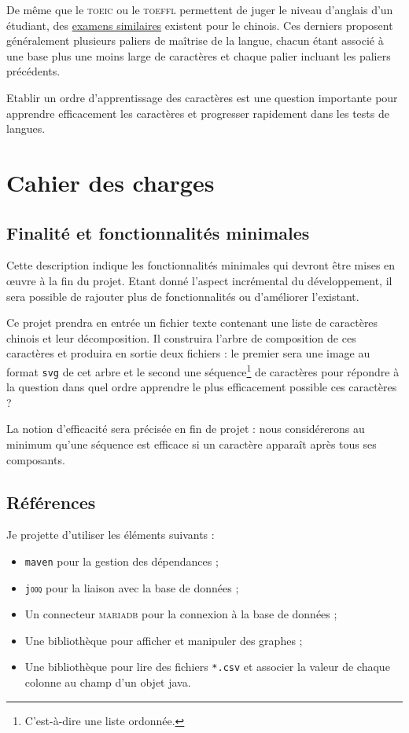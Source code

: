 \documentclass[12pt,oneside]{article}
\begin{document}
De même que le \textsc{toeic} ou le \textsc{toeffl} permettent de juger le niveau d'anglais d'un étudiant, des \href{https://en.wikipedia.org/wiki/Test\_of\_Chinese\_as\_a\_Foreign\_Language}{examens similaires} existent pour le chinois. Ces derniers proposent généralement plusieurs paliers de maîtrise de la langue, chacun étant associé à une base plus une moins large de caractères et chaque palier incluant les paliers précédents.

Etablir un ordre d'apprentissage des caractères est une question importante pour apprendre efficacement les caractères et progresser rapidement dans les tests de langues.

\section{Cahier des charges}

\subsection{Finalité et fonctionnalités minimales}

Cette description indique les fonctionnalités minimales qui devront être mises en œuvre à la fin du projet. Etant donné l'aspect incrémental du développement, il sera possible de rajouter plus de fonctionnalités ou d'améliorer l'existant.

Ce projet prendra en entrée un fichier texte contenant une liste de caractères chinois et leur décomposition. Il construira l'arbre de composition de ces caractères et produira en sortie deux fichiers : le premier sera une image au format \texttt{svg} de cet arbre et le second une séquence\footnote{C'est-à-dire une liste ordonnée.} de caractères pour répondre à la question \og dans quel ordre apprendre le plus efficacement possible ces caractères \fg{} ?

La notion d'efficacité sera précisée en fin de projet : nous considérerons au minimum qu'une séquence est efficace si un caractère apparaît après tous ses composants.

\subsection{Références}

Je projette d'utiliser les éléments suivants :\begin{itemize}
\item \texttt{maven} pour la gestion des dépendances ;
\item \texttt{j\textsc{ooq}} pour la liaison avec la base de données ;
\item Un connecteur \textsc{mariadb} pour la connexion à la base de données ;
\item Une bibliothèque pour afficher et manipuler des graphes ;
\item Une bibliothèque pour lire des fichiers \texttt{*.csv} et associer la valeur de chaque colonne au champ d'un objet java.
\end{itemize}
\end{document}

